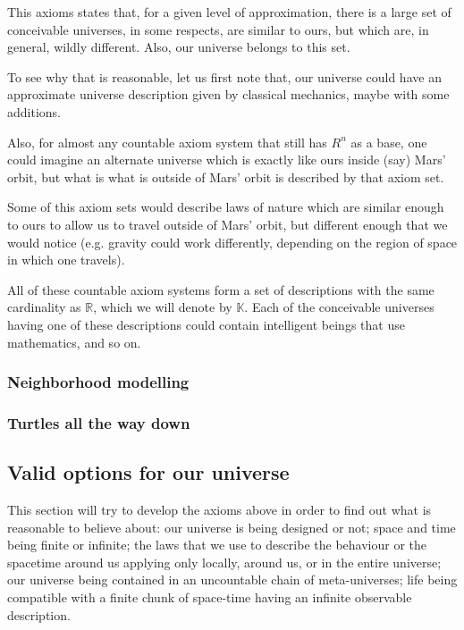 \documentclass[a4paper
,draft
]{article}
\def\reale{\mathbb{R}}
\def\descriptions{\mathbb{K}}
\begin{document}
This axioms states that, for a given level of approximation,
there is a large set of conceivable universes, in some respects,
are similar to ours, but which are, in general, wildly different.
Also, our universe belongs to this set.

To see why that is reasonable, let us first note that,
our universe could have an approximate universe description
given by classical mechanics, maybe with some additions.

Also, for almost any countable axiom system that still
has $R^n$ as a base, one could imagine an alternate universe
which is exactly like ours inside (say) Mars' orbit,
but what is what is outside of Mars' orbit is described by that axiom set.

Some of this axiom sets would describe laws of nature which are similar enough
to ours to allow us to travel outside of Mars' orbit, but different enough that
we would notice (e.g. gravity could work differently, depending on the region
of space in which one travels).

All of these countable axiom systems form a set of descriptions
with the same cardinality as $\reale$, which we will
denote by $\descriptions$. Each of the conceivable universes
having one of these descriptions could contain intelligent beings that use
mathematics, and so on.

\subsubsection{Neighborhood modelling}
\subsubsection{Turtles all the way down}

\subsection{Valid options for our universe}

This section will try to develop the axioms above in order to find out what
is reasonable to believe about: our universe is being designed or not;
space and time being finite or infinite; the laws that we use to describe
the behaviour or the spacetime around us applying only locally, around us,
or in the entire universe;
our universe being contained in an uncountable chain of meta-universes;
life being
compatible with a finite chunk of space-time having an infinite
observable description.
\end{document}
